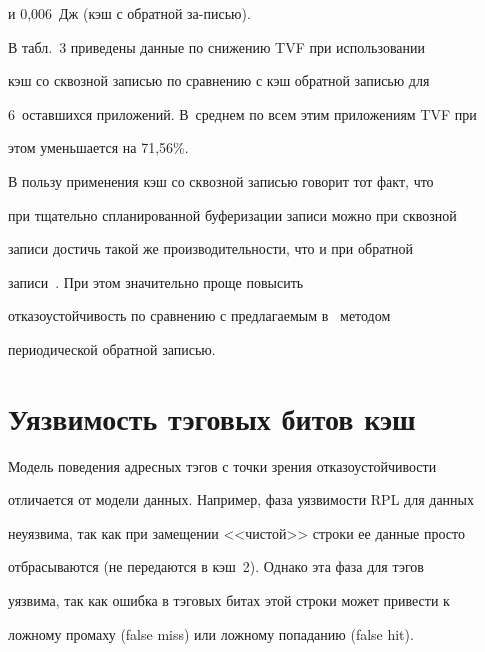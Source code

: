 и 0,006~Дж (кэш  с обратной за-\linebreak писью).


      


      В табл.~3  приведены данные по снижению TVF при использовании 


кэш со сквозной записью по сравнению с кэш обратной записью для 


6~оставшихся приложений. В~среднем по всем этим приложениям TVF  при 


этом уменьшается на 71,56\%.


      


      В пользу применения кэш со сквозной записью говорит тот факт, что 


при тщательно спланированной буферизации записи можно при    сквозной 


записи  достичь такой же  производительности, что и при обратной 


записи~\cite{4-5}.  При этом значительно  проще повысить 


отказоустойчивость по сравнению с предлагаемым в~\cite{1-5} методом 


периодической обратной записью. 


      


\vspace*{-6pt}





\section{Уязвимость тэговых битов кэш}





      Модель поведения адресных тэгов с точки зрения отказоустойчивости 


отличается от модели данных. Например, фаза уязвимости RPL  для  данных 


неуязвима, так как при замещении <<чистой>> строки  ее данные просто 


отбрасываются (не передаются  в кэш~2). Однако эта фаза для   тэгов 


уязвима, так как ошибка в тэговых битах этой строки может привести к 


ложному промаху (false miss) или ложному попаданию (false hit).   





